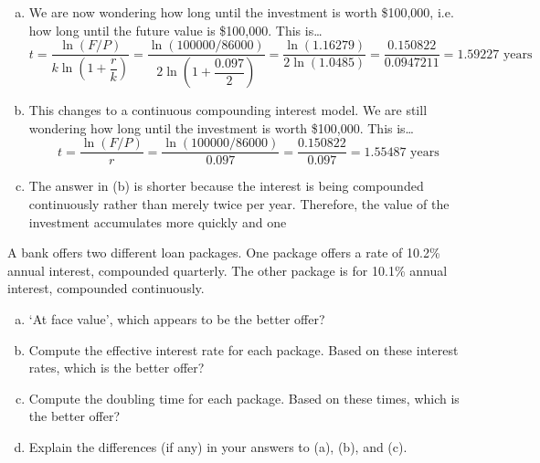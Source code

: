 \documentclass[11pt,letterpaper]{article}
\begin{document}
\begin{enumerate}[(a)]
\item We are now wondering how long until the investment is worth \$100,000, i.e. how long until the future value is \$100,000. This is\dots
	\[
	t= \dfrac{\ln(F/P)}{k \ln \left(1 + \dfrac{r}{k} \right)}= \dfrac{\ln(100000/86000)}{2 \ln \left(1 + \dfrac{0.097}{2} \right)}= \dfrac{\ln(1.16279)}{2\ln(1.0485)}= \dfrac{0.150822}{0.0947211}= 1.59227 \text{ years}
	\] \pspace

\item This changes to a continuous compounding interest model. We are still wondering how long until the investment is worth \$100,000. This is\dots
	\[
	t= \dfrac{\ln(F/P)}{r}= \dfrac{\ln(100000/86000)}{0.097}= \dfrac{0.150822}{0.097}= 1.55487 \text{ years}
	\] \pspace

\item The answer in (b) is shorter because the interest is being compounded continuously rather than merely twice per year. Therefore, the value of the investment accumulates more quickly and one 
\end{enumerate}



\newpage



 A bank offers two different loan packages. One package offers a rate of 10.2\% annual interest, compounded quarterly. The other package is for 10.1\% annual interest, compounded continuously. 
	\begin{enumerate}[(a)]
	\item `At face value', which appears to be the better offer?
	\item Compute the effective interest rate for each package. Based on these interest rates, which is the better offer?
	\item Compute the doubling time for each package. Based on these times, which is the better offer?
	\item Explain the differences (if any) in your answers to (a), (b), and (c). 
	\end{enumerate} \pspace
\end{document}
